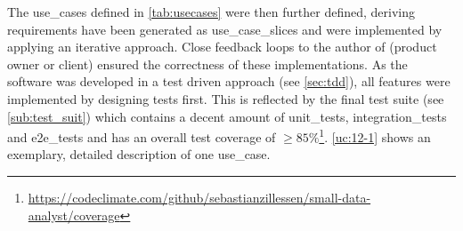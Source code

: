 The \glspl{use_case} defined in \autoref{tab:usecases} were then further defined, deriving requirements have been generated as \glspl{use_case_slice} and were implemented by applying an iterative approach. Close feedback loops to the author of \cite{sassoon2016,sassoon2014,sassoon2016CD} (\gls{product owner} or client) ensured the correctness of these implementations. As the software was developed in a test driven approach (see \autoref{sec:tdd}), all features were implemented by designing tests first. This is reflected by the final test suite (see \autoref{sub:test_suit}) which contains a decent amount of \glspl{unit_test}, \glspl{integration_test} and \glspl{e2e_test} and has an overall test coverage of $ \geq 85\%$\footnote{\url{https://codeclimate.com/github/sebastianzillessen/small-data-analyst/coverage}}. \autoref{uc:12-1} shows an exemplary, detailed description of one \gls{use_case}.

